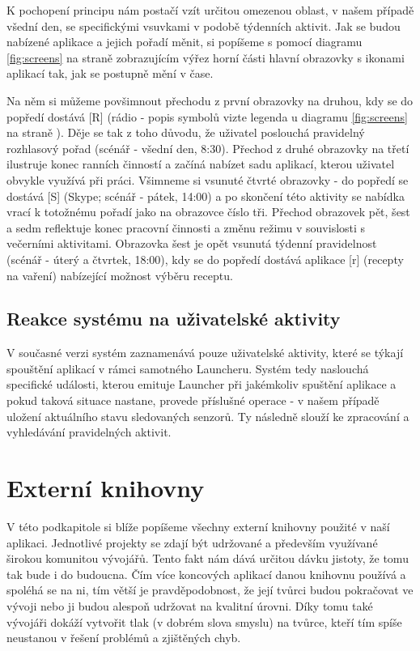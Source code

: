 \documentclass[thesis=M,czech]{FITthesis}[2012/06/26]
\begin{document}
K pochopení principu nám postačí vzít určitou omezenou oblast, v našem případě všední den, se specifickými vsuvkami v podobě týdenních aktivit. Jak se budou nabízené aplikace a jejich pořadí měnit, si popíšeme s pomocí diagramu \ref{fig:screens} na straně \pageref{fig:screens} zobrazujícím výřez horní části hlavní obrazovky s ikonami aplikací tak, jak se postupně mění v čase.

Na něm si můžeme povšimnout přechodu z první obrazovky na druhou, kdy se do popředí dostává [R] (rádio - popis symbolů vizte legenda u diagramu \ref{fig:screens} na straně \pageref{fig:screens}). Děje se tak z toho důvodu, že uživatel poslouchá pravidelný rozhlasový pořad (scénář - všední den, 8:30). Přechod z druhé obrazovky na třetí ilustruje konec ranních činností a začíná nabízet sadu aplikací, kterou uživatel obvykle využívá při práci. Všimneme si vsunuté čtvrté obrazovky - do popředí se dostává [S] (Skype; scénář - pátek, 14:00) a po skončení této aktivity se nabídka vrací k totožnému pořadí jako na obrazovce číslo tři. Přechod obrazovek pět, šest a sedm reflektuje konec pracovní činnosti a změnu režimu v souvislosti s večerními aktivitami. Obrazovka šest je opět vsunutá týdenní pravidelnost (scénář - úterý a čtvrtek, 18:00), kdy se do popředí dostává aplikace [r] (recepty na vaření) nabízející možnost výběru receptu.

\subsection{Reakce systému na uživatelské aktivity}
V současné verzi systém zaznamenává pouze uživatelské aktivity, které se týkají spouštění aplikací v rámci samotného Launcheru. Systém tedy naslouchá specifické události, kterou emituje Launcher při jakémkoliv spuštění aplikace a pokud taková situace nastane, provede příslušné operace - v našem případě uložení aktuálního stavu sledovaných senzorů. Ty následně slouží ke zpracování a vyhledávání pravidelných aktivit.

\section{Externí knihovny}
V této podkapitole si blíže popíšeme všechny externí knihovny použité v naší aplikaci. Jednotlivé projekty se zdají být udržované a především využívané širokou komunitou vývojářů. Tento fakt nám dává určitou dávku jistoty, že tomu tak bude i do budoucna. Čím více koncových aplikací danou knihovnu používá a spoléhá se na ni, tím větší je pravděpodobnost, že její tvůrci budou pokračovat ve vývoji nebo ji budou alespoň udržovat na kvalitní úrovni. Díky tomu také vývojáři dokáží vytvořit tlak (v dobrém slova smyslu) na tvůrce, kteří tím spíše neustanou v řešení problémů a zjištěných chyb.
\end{document}
